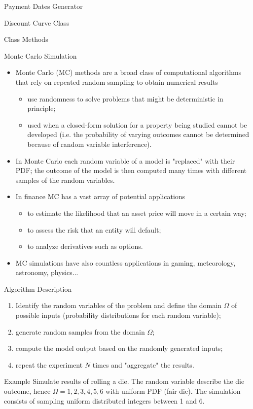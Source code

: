 \documentclass{beamer}
\begin{document}
\begin{frame}[fragile]{Payment Dates Generator}
\begin{itemize}
\begin{frame}{Discount Curve Class}
\begin{frame}{Class Methods}
\begin{itemize}
\begin{iptyhon}
\begin{frame}{Monte Carlo Simulation}
    \begin{itemize}
    \item Monte Carlo (MC) methods are a broad class of computational algorithms that rely on repeated random sampling to obtain numerical results
    \begin{itemize}
        \item use randomness to solve problems that might be deterministic in principle;
        \item used when a closed-form solution for a property being studied cannot be developed (i.e. the probability of varying outcomes cannot be determined because of random variable interference). 
     \end{itemize}
    \item In Monte Carlo each random variable of a model is "replaced" with their PDF; the outcome of the model is then computed many times with different samples of the random variables. 
    \item In finance MC has a vast array of potential applications
    \begin{itemize}
        \item to estimate the likelihood that an asset price will move in a certain way;
        \item to assess the risk that an entity will default;
        \item to analyze derivatives such as options.
     \end{itemize}
    \item MC simulations have also countless applications in gaming, meteorology, astronomy, physics...
    \end{itemize}
\end{frame}

\begin{frame}{Algorithm Description}
    \begin{enumerate}
    \item Identify the random variables of the problem and define the domain $\Omega$ of possible inputs (probability distributions for each random variable);
    \item generate random samples from the domain $\Omega$;
    \item compute the model output based on the randomly generated inputs;
    \item repeat the experiment $N$ times and "aggregate" the results.
    \end{enumerate}
    \begin{block}{Example}
    Simulate results of rolling a die. The random variable describe the die outcome, hence $\Omega = {1,2,3,4,5,6}$ with uniform PDF (fair die).
    The simulation consists of sampling uniform distributed integers between 1 and 6.
    \end{block}
\end{frame}


\end{iptyhon}
\end{itemize}
\end{frame}
\end{frame}
\end{itemize}
\end{frame}
\end{document}

